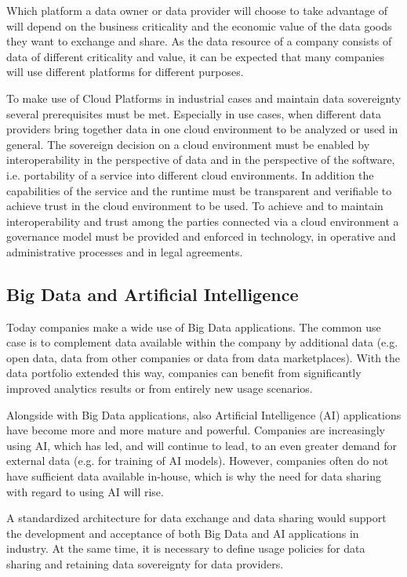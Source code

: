 Which platform a data owner or data provider will choose to take advantage of will depend on the business criticality and the economic value of the data goods they want to exchange and share. As the data resource of a company consists of data of different criticality and value, it can be expected that many companies will use different platforms for different purposes.

To make use of Cloud Platforms in industrial cases and maintain data sovereignty several prerequisites must be met. Especially in use cases, when different data providers bring together data in one cloud environment to be analyzed or used in general. The sovereign decision on a cloud environment must be enabled by interoperability in the perspective of data and in the perspective of the software, i.e. portability of a service into different cloud environments. In addition the capabilities of the service and the runtime must be transparent and verifiable to achieve trust in the cloud environment to be used. To achieve and to maintain interoperability and trust among the parties connected via a cloud environment a governance model must be provided and enforced in technology, in operative and administrative processes and  in legal agreements. 



\subsection{Big Data and Artificial Intelligence}\label{subsec:bigdata_ai}
Today companies make a wide use of Big Data applications. The common use case is to complement data available within the company by additional data (e.g. open data, data from other companies or data from data marketplaces). With the data portfolio extended this way, companies can benefit from significantly improved analytics results or from entirely new usage scenarios. 

Alongside with Big Data applications, also Artificial Intelligence (AI) applications have become more and more mature and powerful. Companies are increasingly using AI, which has led, and will continue to lead, to an even greater demand for external data (e.g. for training of AI models). However, companies often do not have sufficient data available in-house, which is why the need for data sharing with regard to using AI will rise.   

A standardized architecture for data exchange and data sharing would support the development and acceptance of both Big Data and AI applications in industry. At the same time, it is necessary to define usage policies for data sharing and retaining data sovereignty for data providers. 



